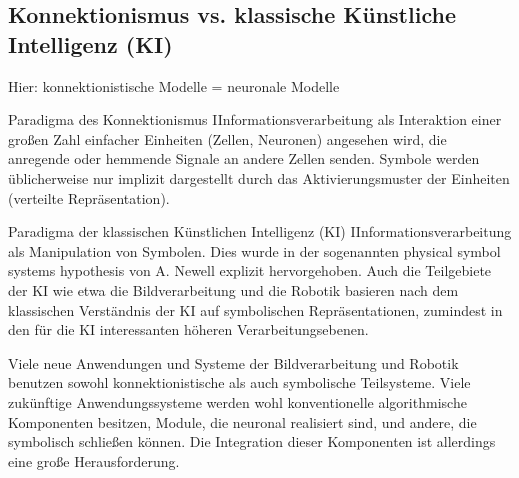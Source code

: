 \subsection*{Konnektionismus vs. klassische Künstliche Intelligenz (KI)}
Hier: konnektionistische Modelle = neuronale Modelle
\begin{mytheo}{Paradigma des Konnektionismus}
IInformationsverarbeitung als
Interaktion einer großen Zahl einfacher Einheiten (Zellen, Neuronen) angesehen
wird, die anregende oder hemmende Signale an andere Zellen senden. Symbole
werden üblicherweise nur implizit dargestellt durch das Aktivierungsmuster der
Einheiten (verteilte Repräsentation).
\end{mytheo}
\begin{mytheo}{Paradigma der klassischen Künstlichen Intelligenz (KI)}
IInformationsverarbeitung als Manipulation von Symbolen. Dies wurde in der
sogenannten physical symbol systems hypothesis von A. Newell explizit
hervorgehoben. Auch die Teilgebiete der KI wie etwa die Bildverarbeitung und die
Robotik basieren nach dem klassischen Verständnis der KI auf symbolischen
Repräsentationen, zumindest in den für die KI interessanten höheren
Verarbeitungsebenen. 
\end{mytheo}
Viele neue Anwendungen
und Systeme der Bildverarbeitung und Robotik benutzen sowohl
konnektionistische als auch symbolische Teilsysteme.
Viele zukünftige Anwendungssysteme werden wohl konventionelle algorithmische
Komponenten besitzen, Module, die neuronal realisiert sind, und andere, die
symbolisch schließen können. Die Integration dieser Komponenten ist allerdings
eine große Herausforderung.
